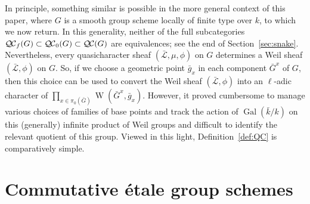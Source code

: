 \documentclass[11pt]{amsart}
\theoremstyle{plain}
\theoremstyle{definition}
\theoremstyle{remark}
\newcommand{\bFq}{\bar{k}}
\newcommand{\Fq}{k}
\DeclareMathOperator{\Gal}{Gal}
\DeclareMathOperator{\W}{W}
\newcommand{\gqcs}[1]{{\mathcal{\bar #1}}}
\newcommand{\QC}{{\mathcal{Q\hskip-0.8pt C}}}
\newcommand{\QCb}{{\QC_0}}
\newcommand{\QCf}{{\QC_f}}
\newcommand{\bG}{\bar{G}}
\begin{document}
In principle, something similar is possible in the more general 
context of this paper, where $G$ is a smooth group scheme 
locally of finite type over $\Fq$, to which we now return. 
In this generality, neither of the full subcategories $\QCf(G) \subset \QCb(G) \subset \QC(G)$ are equivalences;
see the end of Section~\ref{sec:snake}.
Nevertheless, every quasicharacter sheaf $(\gqcs{L},\mu,\phi)$ on $G$ 
determines a Weil sheaf $(\gqcs{L},\phi)$ on $G$. 
So, if we choose a geometric point ${\bar g}_x$ in each component $\bG^x$ of $G$, then this choice can be used to convert 
the Weil sheaf $(\gqcs{L},\phi)$ into an $\ell$-adic character of $\prod_{x\in \pi_0(\bG)}\W(\bG^x, {\bar g}_x)$. 
However, it proved cumbersome to manage various 
choices of families of base points and track the action 
of $\Gal(\bFq/\Fq)$ on this (generally) infinite product of 
Weil groups and difficult to identify the relevant quotient of this group.
Viewed in this light, Definition~\ref{def:QC} is comparatively simple.

\section{Commutative \'etale group schemes} \label{sec:etale}

%
\end{document}
